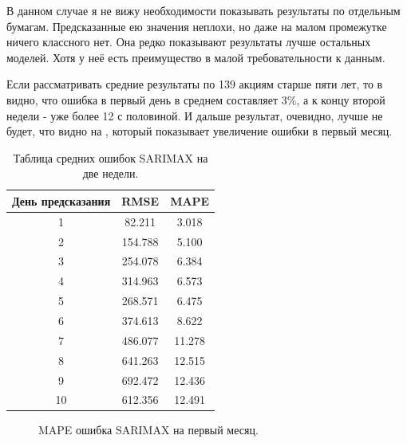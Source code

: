 \documentclass[12pt, a4paper]{article}
\begin{document}
В данном случае я не вижу необходимости показывать результаты по отдельным бумагам. Предсказанные ею значения неплохи, но даже на малом промежутке ничего классного нет. Она редко показывают результаты лучше остальных моделей. Хотя у неё есть преимущество в малой требовательности к данным.

Если рассматривать средние результаты по 139 акциям старше пяти лет, то в  видно, что ошибка в первый день в среднем составляет 3\%, а к концу второй недели - уже более 12 с половиной. И дальше результат, очевидно, лучше не будет, что видно на , который показывает увеличение ошибки в первый месяц.
\begin{table}[H]
\centering
\caption{Таблица средних ошибок SARIMAX на две недели.}
\begin{tabular}{ |c|c|c| } 
 \hline
 День предсказания & RMSE & MAPE \\ 
 \hline
1 & 82.211 & 3.018 \\ 
 \hline
2 & 154.788 & 5.100 \\ 
 \hline
3 & 254.078 & 6.384 \\ 
 \hline
4 & 314.963 & 6.573 \\ 
 \hline
5 & 268.571 & 6.475 \\ 
 \hline
6 & 374.613 & 8.622 \\ 
 \hline
7 & 486.077 & 11.278 \\ 
 \hline
8 & 641.263 & 12.515 \\ 
 \hline
9 & 692.472 & 12.436 \\ 
 \hline
10 & 612.356 & 12.491 \\ 
 \hline
\end{tabular}
\label{tab:sarimax}
\end{table}
\begin{figure}[!h]
\caption{MAPE ошибка SARIMAX на первый месяц.}
\label{fig:sarimax}
\end{figure}
\end{document}
